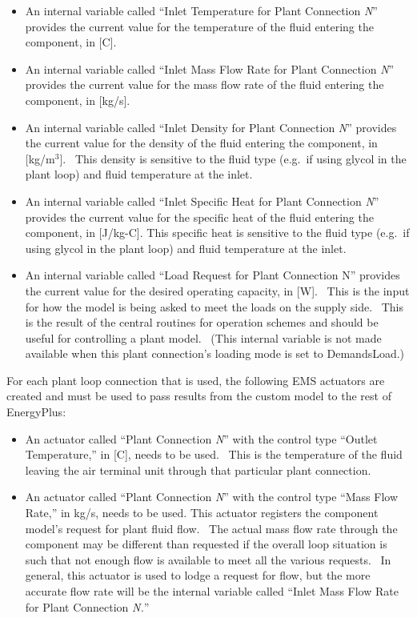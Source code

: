 \begin{itemize}
\item
  An internal variable called ``Inlet Temperature for Plant Connection \emph{N}'' provides the current value for the temperature of the fluid entering the component, in {[}C{]}.
\item
  An internal variable called ``Inlet Mass Flow Rate for Plant Connection \emph{N}'' provides the current value for the mass flow rate of the fluid entering the component, in {[}kg/s{]}.
\item
  An internal variable called ``Inlet Density for Plant Connection \emph{N}'' provides the current value for the density of the fluid entering the component, in {[}kg/m\(^{3}\){]}.~ This density is sensitive to the fluid type (e.g.~if using glycol in the plant loop) and fluid temperature at the inlet.
\item
  An internal variable called ``Inlet Specific Heat for Plant Connection \emph{N}'' provides the current value for the specific heat of the fluid entering the component, in {[}J/kg-C{]}. This specific heat is sensitive to the fluid type (e.g.~if using glycol in the plant loop) and fluid temperature at the inlet.
\item
  An internal variable called ``Load Request for Plant Connection N'' provides the current value for the desired operating capacity, in {[}W{]}.~ This is the input for how the model is being asked to meet the loads on the supply side.~ This is the result of the central routines for operation schemes and should be useful for controlling a plant model.~ (This internal variable is not made available when this plant connection's loading mode is set to DemandsLoad.)
\end{itemize}

For each plant loop connection that is used, the following EMS actuators are created and must be used to pass results from the custom model to the rest of EnergyPlus:

\begin{itemize}
\item
  An actuator called ``Plant Connection \emph{N}'' with the control type ``Outlet Temperature,'' in {[}C{]}, needs to be used.~ This is the temperature of the fluid leaving the air terminal unit through that particular plant connection.
\item
  An actuator called ``Plant Connection \emph{N}'' with the control type ``Mass Flow Rate,'' in kg/s, needs to be used. This actuator registers the component model's request for plant fluid flow.~ The actual mass flow rate through the component may be different than requested if the overall loop situation is such that not enough flow is available to meet all the various requests.~ In general, this actuator is used to lodge a request for flow, but the more accurate flow rate will be the internal variable called ``Inlet Mass Flow Rate for Plant Connection \emph{N.}''
\end{itemize}

